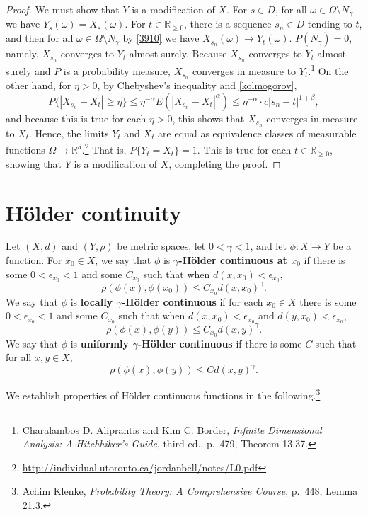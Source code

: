 \documentclass{article}
\theoremstyle{definition}
\begin{document}
\begin{proof}
We must show that $Y$ is a modification of $X$. For $s \in D$, for all $\omega \in \Omega \setminus N_\gamma$ we have
$Y_s(\omega) = X_s(\omega)$. For $t \in \mathbb{R}_{\geq 0}$, there is a sequence $s_n \in D$ tending to $t$, and then
for all $\omega \in \Omega \setminus N_\gamma$  by \eqref{3910} we have $X_{s_n}(\omega) \to Y_t(\omega)$. 
$P(N_\gamma)=0$, namely, $X_{s_n}$ converges to $Y_t$ almost surely. Because $X_{s_n}$ converges to $Y_t$
almost surely and $P$ is a probability measure, $X_{s_n}$ converges in measure to $Y_t$.\footnote{Charalambos D. Aliprantis
and Kim C. Border, {\em Infinite Dimensional Analysis: A Hitchhiker's Guide}, third ed., p.~479, Theorem 13.37.}
On the other hand, 
for
$\eta>0$, by  Chebyshev's inequality and \eqref{kolmogorov},
\[
P\{|X_{s_n}-X_t| \geq \eta\} \leq \eta^{-\alpha} E(|X_{s_n}-X_t|^\alpha) \leq \eta^{-\alpha} \cdot c |s_n-t|^{1+\beta},
\]
and because this is true for each $\eta>0$,
this shows that $X_{s_n}$ converges in measure to $X_t$. Hence, 
the limits $Y_t$ and $X_t$ are equal as  equivalence classes of
measurable functions $\Omega \to \mathbb{R}^d$.\footnote{\url{http://individual.utoronto.ca/jordanbell/notes/L0.pdf}}
That is, $P\{Y_t = X_t\}=1$.  This is true for each $t \in \mathbb{R}_{\geq 0}$, showing that $Y$ is a modification of $X$, completing the proof.
\end{proof}

\section{H\"older continuity}
Let $(X,d)$ and $(Y,\rho)$ be metric spaces, let $0<\gamma<1$, and let
$\phi:X \to Y$ be a function. For 
$x_0 \in X$, we say that $\phi$ is \textbf{$\gamma$-H\"older continuous at $x_0$}
if there is some $0<\epsilon_{x_0}<1$ and some $C_{x_0}$ such that when
$d(x,x_0)< \epsilon_{x_0}$,
\[
\rho(\phi(x),\phi(x_0)) \leq C_{x_0} d(x,x_0)^\gamma.
\]
We say that $\phi$ is \textbf{locally $\gamma$-H\"older continuous} if for each
$x_0 \in X$ there is some $0<\epsilon_{x_0}<1$ and some
$C_{x_0}$ such that when $d(x,x_0)< \epsilon_{x_0}$ and $d(y,x_0)< \epsilon_{x_0}$,
\[
\rho(\phi(x),\phi(y)) \leq C_{x_0} d(x,y)^\gamma.
\]
We say that $\phi$ is \textbf{uniformly $\gamma$-H\"older continuous} if there is some
$C$ such that for all $x,y \in X$,
\[
\rho(\phi(x),\phi(y)) \leq C d(x,y)^\gamma.
\]

We establish properties of H\"older continuous functions in the following.\footnote{Achim Klenke, {\em Probability Theory: A Comprehensive Course}, p.~448, Lemma 21.3.}
\end{document}
